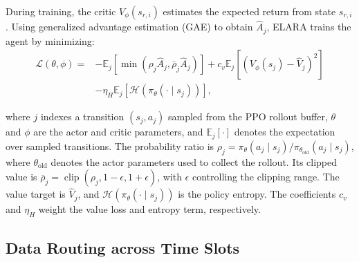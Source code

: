 \documentclass[10pt, conference, letterpaper]{IEEEtran}
\begin{document}
During training, the critic $V_\phi(s_{r,i})$ estimates the expected return from state $s_{r,i}$. Using generalized advantage estimation (GAE) to obtain $\widehat A_j$, ELARA trains the agent by minimizing:
\begin{align}
\mathcal L(\theta,\phi)=&-\mathbb E_j\!\left[\min(\rho_j\widehat A_j,
\bar\rho_j\widehat A_j)\right]
+c_v\mathbb E_j\!\left[(V_\phi(s_j)-\widehat V_j)^2\right]\nonumber\\
&-\eta_H\mathbb E_j[\mathcal H(\pi_\theta(\cdot\mid s_j))],
\label{eq:new_ppo_loss}
\end{align}

where $j$ indexes a transition $(s_j,a_j)$ sampled from the PPO rollout buffer, $\theta$ and $\phi$ are the actor and critic parameters, and $\mathbb E_j[\cdot]$ denotes the expectation over sampled transitions. The probability ratio is $\rho_j=\pi_\theta(a_j\mid s_j)/\pi_{\theta_{\mathrm{old}}}(a_j\mid s_j)$, where $\theta_{\mathrm{old}}$ denotes the actor parameters used to collect the rollout. Its clipped value is $\bar\rho_j=\operatorname{clip}(\rho_j,1-\epsilon,1+\epsilon)$, with $\epsilon$ controlling the clipping range. The value target is $\widehat V_j$, and $\mathcal H(\pi_\theta(\cdot\mid s_j))$ is the policy entropy. The coefficients $c_v$ and $\eta_H$ weight the value loss and entropy term, respectively.


\subsection{Data Routing across Time Slots}
\end{document}
